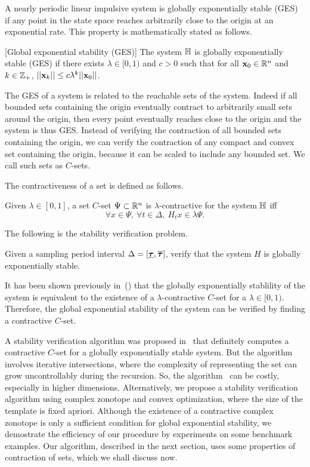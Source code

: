 A nearly periodic linear impulsive system is globally exponentially
stable (GES) if any point in the state space reaches arbitrarily close
to the origin at an exponential rate.  This property is mathematically
stated as follows.
%
\begin{defn}\label{defn:exp-stable}[Global exponential stability (GES)] The
system $\mathbb{H}$ is globally exponentially stable
(GES) if there exists $\lambda\in[0,1)$ and $c>0$ such that for all $\textbf{x}_0
\in\mathbb{R}^n$ and $k\in\mathbb{Z}_+$,
$||\textbf{x}_k||\leq c\lambda^k||\textbf{x}_0||$.
\end{defn}
%
The GES of a system is related to the reachable sets of the
system. Indeed if all bounded sets containing the origin eventually
contract to arbitrarily small sets around the origin, then every point
eventually reaches close to the origin and the system is thus
GES. Instead of verifying the contraction of all bounded sets
containing the origin, we can verify the contraction of any compact
and convex set containing the origin, because it can be scaled to
include any bounded set. We
call such sets as $C$-sets.

The contractiveness of a set is defined as follows.
%
\begin{definition}
Given $\lambda\in[0,1]$, a set $C$-set $\Psi\subset\mathbb{R}^n$ is
$\lambda$-contractive for the system $\mathbb{H}$ iff
\[\forall x\in\Psi,~\forall t\in\Delta,~H_tx\in\lambda\Psi.\]
\end{definition}
%
The following is the stability verification problem.
%
\begin{problem}
Given a sampling period interval $\Delta=[\bm{\underline{\tau}},\bm{\overline{\tau}}]$, verify
that the system $H$ is globally exponentially stable.
\end{problem}
%
\begin{remark} It has been shown previously
in~(\cite{2014-fiacchini-set,athanasopoulos2014alternative,AlKhatib2015})
that the globally exponentially stablility of the system is equivalent
to the existence of a $\lambda$-contractive $C$-set for a
$\lambda\in[0,1)$.  Therefore, the global exponential stability of the
  system can be verified by finding a contractive $C$-set.
\end{remark}
%
  A stability verification algorithm was proposed
  in~\cite{2014-fiacchini-set} that definitely computes a contractive
  $C$-set for a globally exponentially stable system.  But the
  algorithm involves iterative intersections, where the complexity of
  representing the set can grow uncontrollably during the recursion.
  So, the algorithm~\cite{2014-fiacchini-set} can be costly,
  especially in higher dimensions.  Alternatively, we propose a
  stability verification algorithm using complex zonotope and convex
  optimization, where the size of the template is fixed apriori.
  Although the existence of a contractive complex zonotope is only a
  sufficient condition for global exponential stability, we demostrate
  the efficiency of our procedure by experiments on some benchmark
  examples.  Our algorithm, described in the next section, uses some
  properties of contraction of sets, which we shall discuss now.


